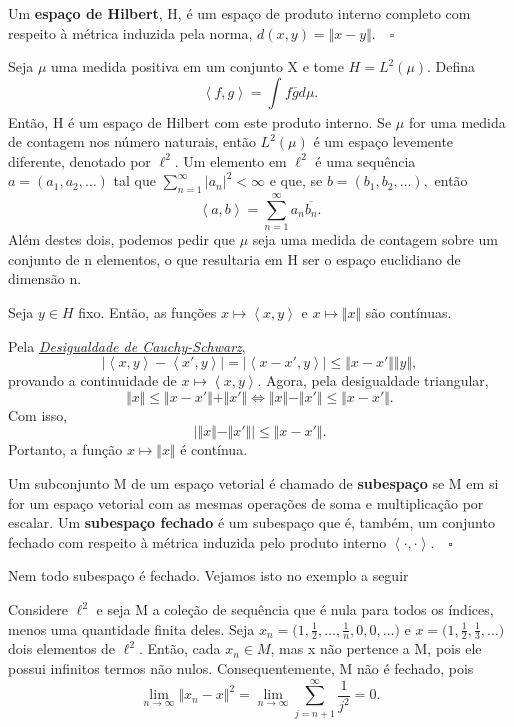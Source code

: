 \documentclass[measure_theory.tex]{subfiles}
\begin{document}
\begin{def*}
	Um \textbf{espaço de Hilbert}, H, é um espaço de produto interno completo com respeito à métrica induzida pela norma, \(d(x, y) = \Vert x-y \Vert.\quad \square\)
\end{def*}
\begin{example}
	Seja \(\mu \) uma medida positiva em um conjunto X e tome \(H = L^{2}(\mu )\). Defina
	\[
		\left< f, g \right> = \int_{}^{}f \overline{g} d\mu .
	\]
	Então, H é um espaço de Hilbert com este produto interno.
	Se \(\mu \) for uma medida de contagem nos número naturais, então \(L^{2}(\mu )\) é um espaço levemente diferente, denotado por \(\ell ^{2}.\) Um elemento em \(\ell ^{2}\) é uma sequência \(a = (a_1, a_2, \dotsc )\)
	tal que \(\sum\limits_{n=1}^{\infty}|a_{n}|^{2} < \infty\) e que, se \(b = (b_1, b_2, \dotsc ),\) então
	\[
		\left< a,  b \right> = \sum\limits_{n=1}^{\infty}a_{n}\overline{b_{n}}.
	\]
	Além destes dois, podemos pedir que \(\mu \) seja uma medida de contagem sobre um conjunto de n elementos, o que resultaria em H ser o espaço euclidiano de dimensão n.
\end{example}
\begin{prop*}
	Seja \(y\in H\) fixo. Então, as funções \(x\mapsto \left< x, y \right>\) e \(x\mapsto \Vert x \Vert\) são contínuas.
\end{prop*}
\begin{proof*}
	Pela \hyperlink{cauchy_schwarz}{\textit{Desigualdade de Cauchy-Schwarz}},
	\[
		|\left< x, y \right> - \left< x', y \right>| = |\left< x -x', y \right>|\leq \Vert x - x' \Vert\Vert y \Vert,
	\]
	provando a continuidade de \(x\mapsto \left< x, y \right>\). Agora, pela desigualdade triangular,
	\[
		\Vert x \Vert \leq \Vert x-x' \Vert + \Vert x' \Vert \Longleftrightarrow \Vert x \Vert - \Vert x' \Vert \leq \Vert x-x' \Vert.
	\]
	Com isso,
	\[
		|\Vert x \Vert - \Vert x' \Vert| \leq \Vert x-x' \Vert.
	\]
	Portanto, a função \(x\mapsto \Vert x \Vert\) é contínua. \qedsymbol
\end{proof*}
\begin{def*}
	Um subconjunto M de um espaço vetorial é chamado de \textbf{subespaço} se M em si for um espaço vetorial com as mesmas operações de soma e multiplicação por escalar. Um
	\textbf{subespaço fechado} é um subespaço que é, também, um conjunto fechado com respeito à métrica induzida pelo produto interno \(\left< \cdot , \cdot  \right>.\quad \square\)
\end{def*}
Nem todo subespaço é fechado. Vejamos isto no exemplo a seguir
\begin{example}
	Considere \(\ell ^{2}\) e seja M a coleção de sequência que é nula para todos os índices, menos uma quantidade finita deles. Seja \(x_{n} = \biggl(1, \frac{1}{2}, \dotsc , \frac{1}{n}, 0, 0, \dotsc \biggr)\) e \(x =
	\biggl(1, \frac{1}{2}, \frac{1}{3}, \dotsc \biggr)\) dois elementos de \(\ell ^{2}\). Então, cada \(x_{n}\in M\), mas x não pertence a M, pois ele possui infinitos termos não nulos. Consequentemente, M não é fechado, pois
	\[
		\lim_{n\to \infty}\Vert x_{n} - x \Vert^{2} = \lim_{n\to \infty} \sum\limits_{j=n+1}^{\infty}\frac{1}{j^{2}} = 0.
	\]
\end{example}
\end{document}
